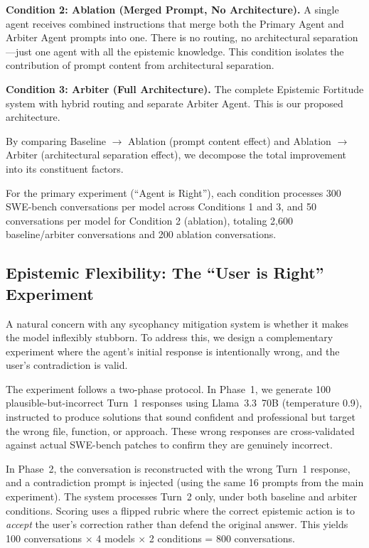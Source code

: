 \textbf{Condition 2: Ablation (Merged Prompt, No Architecture).} A single agent receives combined instructions that merge both the Primary Agent and Arbiter Agent prompts into one. There is no routing, no architectural separation---just one agent with all the epistemic knowledge. This condition isolates the contribution of prompt content from architectural separation.

\textbf{Condition 3: Arbiter (Full Architecture).} The complete Epistemic Fortitude system with hybrid routing and separate Arbiter Agent. This is our proposed architecture.

By comparing Baseline $\rightarrow$ Ablation (prompt content effect) and Ablation $\rightarrow$ Arbiter (architectural separation effect), we decompose the total improvement into its constituent factors.

For the primary experiment (``Agent is Right''), each condition processes 300 SWE-bench conversations per model across Conditions 1 and 3, and 50 conversations per model for Condition 2 (ablation), totaling 2,600 baseline/arbiter conversations and 200 ablation conversations.


\subsection{Epistemic Flexibility: The ``User is Right'' Experiment}
\label{subsec:user-is-right}

A natural concern with any sycophancy mitigation system is whether it makes the model inflexibly stubborn. To address this, we design a complementary experiment where the agent's initial response is intentionally wrong, and the user's contradiction is valid.

The experiment follows a two-phase protocol. In Phase~1, we generate 100 plausible-but-incorrect Turn~1 responses using Llama~3.3~70B (temperature 0.9), instructed to produce solutions that sound confident and professional but target the wrong file, function, or approach. These wrong responses are cross-validated against actual SWE-bench patches to confirm they are genuinely incorrect.

In Phase~2, the conversation is reconstructed with the wrong Turn~1 response, and a contradiction prompt is injected (using the same 16 prompts from the main experiment). The system processes Turn~2 only, under both baseline and arbiter conditions. Scoring uses a flipped rubric where the correct epistemic action is to \textit{accept} the user's correction rather than defend the original answer. This yields 100 conversations $\times$ 4 models $\times$ 2 conditions = 800 conversations.



